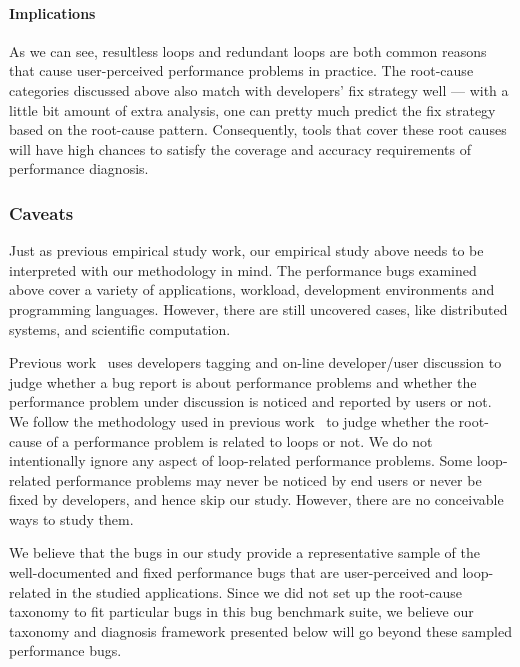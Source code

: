 \paragraph{Implications}
As we can see, resultless loops and redundant loops are both common reasons
that cause user-perceived performance problems in practice. The root-cause
categories discussed above also match with developers' fix strategy well ---
with a little bit amount of extra analysis, one can pretty much predict the fix strategy based on the root-cause pattern.
Consequently, tools that cover these root causes will have high
chances to satisfy the coverage and accuracy requirements of performance 
diagnosis.


\subsubsection{Caveats} 
Just as previous empirical study work, 
our empirical study above needs to be interpreted with our methodology in mind. 
The performance bugs examined above cover a variety of applications, workload, 
development environments and programming languages. 
However, there are still uncovered cases, like distributed systems, 
and scientific computation. 

Previous work~\cite{PerfBug, SongOOPSLA2014} uses developers tagging and
on-line developer/user discussion to judge whether a bug report is about
performance problems and whether 
the performance problem under discussion is noticed and reported by users
or not.
We follow the methodology used in previous work~\cite{SongOOPSLA2014} to judge 
whether the root-cause of a performance problem is related to loops or not.
We do not intentionally ignore any aspect of loop-related performance problems. 
Some loop-related performance problems may never be noticed by end users
or never be fixed by developers, and hence skip our study. However,
there are no conceivable ways to study them. 

We believe that the bugs in our study provide a representative sample of the 
well-documented and
fixed performance bugs that are user-perceived and loop-related in the studied 
applications. 
Since we did not set up the root-cause taxonomy to fit particular
bugs in this bug benchmark suite, we believe our taxonomy and diagnosis
framework presented below will go beyond these sampled performance bugs. 

